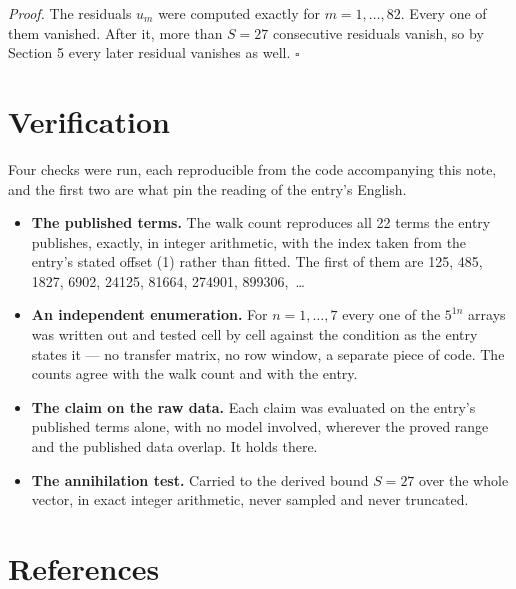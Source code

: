 \documentclass[11pt]{article}
\theoremstyle{definition}
\begin{document}
{\itshape Proof.} The residuals $u_m$ were computed exactly for $m = 1,\dots,82$. Every one of them vanished. After it, more than $S = 27$ consecutive residuals vanish, so by Section 5 every later residual vanishes as well. $\square$

\section{Verification}

Four checks were run, each reproducible from the code accompanying this note, and the first two are what pin the reading of the entry's English.

\begin{itemize}

\item {\bfseries The published terms.} The walk count reproduces all 22 terms the entry publishes, exactly, in integer arithmetic, with the index taken from the entry's stated offset (1) rather than fitted. The first of them are 125, 485, 1827, 6902, 24125, 81664, 274901, 899306,~\dots

\item {\bfseries An independent enumeration.} For $n = 1,\dots,7$ every one of the $5^{1n}$ arrays was written out and tested cell by cell against the condition as the entry states it --- no transfer matrix, no row window, a separate piece of code. The counts agree with the walk count and with the entry.

\item {\bfseries The claim on the raw data.} Each claim was evaluated on the entry's published terms alone, with no model involved, wherever the proved range and the published data overlap. It holds there.

\item {\bfseries The annihilation test.} Carried to the derived bound $S = 27$ over the whole vector, in exact integer arithmetic, never sampled and never truncated.

\end{itemize}

\section{References}
\end{document}
